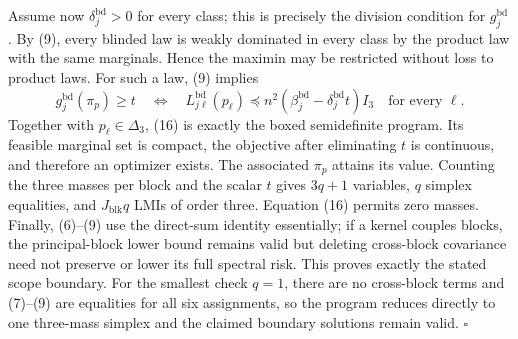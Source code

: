 Assume now \(\delta_j^{\mathrm{bd}}>0\) for every class; this is precisely the division condition for \(g_j^{\mathrm{bd}}\).  By (9), every blinded law is weakly dominated in every class by the product law with the same marginals.  Hence the maximin may be restricted without loss to product laws.  For such a law, (9) implies
\[
g_j^{\mathrm{bd}}(\pi_p)\ge t
\quad\Longleftrightarrow\quad
L_{j\ell}^{\mathrm{bd}}(p_\ell)
\preceq n^2(\beta_j^{\mathrm{bd}}-\delta_j^{\mathrm{bd}}t)I_3
\quad\text{for every }\ell. \tag{16}
\]
Together with \(p_\ell\in\Delta_3\), (16) is exactly the boxed semidefinite program.  Its feasible marginal set is compact, the objective after eliminating \(t\) is continuous, and therefore an optimizer exists.  The associated \(\pi_p\) attains its value.  Counting the three masses per block and the scalar \(t\) gives \(3q+1\) variables, \(q\) simplex equalities, and \(J_{\mathrm{blk}}q\) LMIs of order three.  Equation (16) permits zero masses.  Finally, (6)--(9) use the direct-sum identity essentially; if a kernel couples blocks, the principal-block lower bound remains valid but deleting cross-block covariance need not preserve or lower its full spectral risk.  This proves exactly the stated scope boundary.  For the smallest check \(q=1\), there are no cross-block terms and (7)--(9) are equalities for all six assignments, so the program reduces directly to one three-mass simplex and the claimed boundary solutions remain valid. \(\square\)